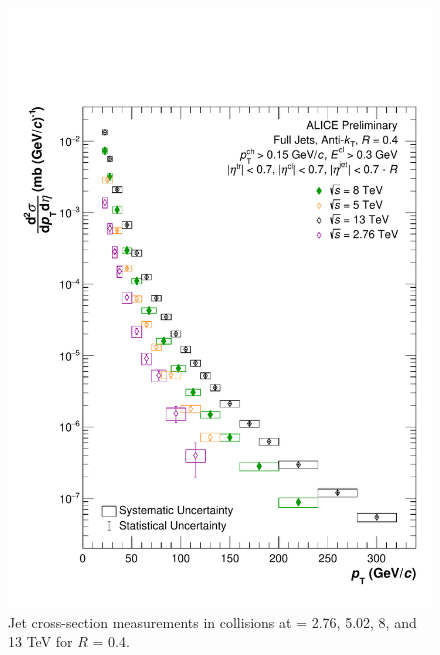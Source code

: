 \begin{figure}[hbt!]
    \centering
    \includegraphics[width=\textwidth]{figures/EnergyComparisons/SpectrumComparison_R04.pdf}
    \caption{Jet cross-section measurements in \pp collisions at \s = 2.76, 5.02, 8, and 13 TeV for $R$ = 0.4.}
    \label{fig:specCompareR04}
\end{figure}

